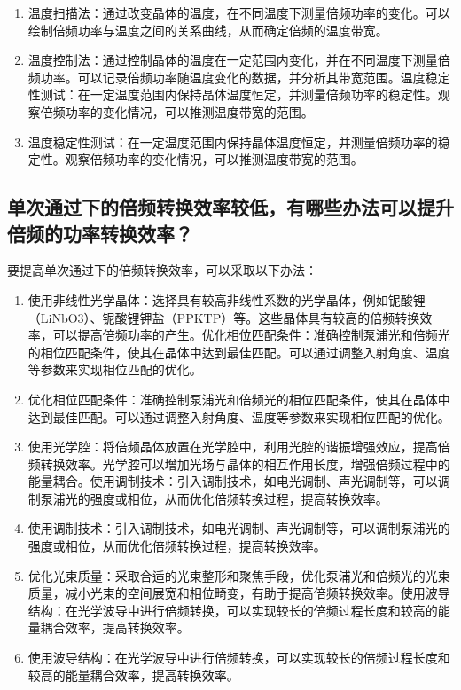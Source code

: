 \documentclass[a4paper,UTF8]{ctexart}
\begin{document}
\begin{enumerate}
    \item 温度扫描法：通过改变晶体的温度，在不同温度下测量倍频功率的变化。可以绘制倍频功率与温度之间的关系曲线，从而确定倍频的温度带宽。
    \item 温度控制法：通过控制晶体的温度在一定范围内变化，并在不同温度下测量倍频功率。可以记录倍频功率随温度变化的数据，并分析其带宽范围。温度稳定性测试：在一定温度范围内保持晶体温度恒定，并测量倍频功率的稳定性。观察倍频功率的变化情况，可以推测温度带宽的范围。
    \item 温度稳定性测试：在一定温度范围内保持晶体温度恒定，并测量倍频功率的稳定性。观察倍频功率的变化情况，可以推测温度带宽的范围。
\end{enumerate}

\subsection{单次通过下的倍频转换效率较低，有哪些办法可以提升倍频的功率转换效率？}

要提高单次通过下的倍频转换效率，可以采取以下办法：

\begin{enumerate}
    \item 使用非线性光学晶体：选择具有较高非线性系数的光学晶体，例如铌酸锂（LiNbO3）、铌酸锂钾盐（PPKTP）等。这些晶体具有较高的倍频转换效率，可以提高倍频功率的产生。优化相位匹配条件：准确控制泵浦光和倍频光的相位匹配条件，使其在晶体中达到最佳匹配。可以通过调整入射角度、温度等参数来实现相位匹配的优化。
    \item 优化相位匹配条件：准确控制泵浦光和倍频光的相位匹配条件，使其在晶体中达到最佳匹配。可以通过调整入射角度、温度等参数来实现相位匹配的优化。
    \item 使用光学腔：将倍频晶体放置在光学腔中，利用光腔的谐振增强效应，提高倍频转换效率。光学腔可以增加光场与晶体的相互作用长度，增强倍频过程中的能量耦合。使用调制技术：引入调制技术，如电光调制、声光调制等，可以调制泵浦光的强度或相位，从而优化倍频转换过程，提高转换效率。
    \item 使用调制技术：引入调制技术，如电光调制、声光调制等，可以调制泵浦光的强度或相位，从而优化倍频转换过程，提高转换效率。
    \item 优化光束质量：采取合适的光束整形和聚焦手段，优化泵浦光和倍频光的光束质量，减小光束的空间展宽和相位畸变，有助于提高倍频转换效率。使用波导结构：在光学波导中进行倍频转换，可以实现较长的倍频过程长度和较高的能量耦合效率，提高转换效率。
    \item 使用波导结构：在光学波导中进行倍频转换，可以实现较长的倍频过程长度和较高的能量耦合效率，提高转换效率。
\end{enumerate}
\end{document}

